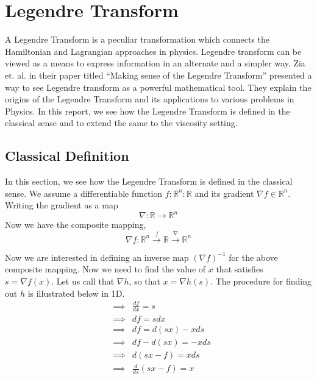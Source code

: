 \section{Legendre Transform}
A Legendre Transform is a peculiar transformation which connects the
Hamiltonian and Lagrangian approaches in physics. Legendre transform
can be viewed as a means to express information in an alternate and a
simpler way. Zia et. al. in their paper titled ``Making sense of the
Legendre Transform''\cite{ZIA} presented a way to see Legendre transform as a
powerful mathematical tool. They explain the origins of the Legendre
Transform and its applications to various problems in Physics. In this
report, we see how the Legendre Transform is defined in the classical
sense and to extend the same to the viscosity setting.

\subsection{Classical Definition}
In this section, we see how the Legendre Transform is defined in the
classical sense. We assume a differentiable function $f:\mathbb{R}^n :
\mathbb{R}$ and its
gradient $\nabla f \in \mathbb{R}^n$. Writing the gradient as a map
\begin{equation}
  \nabla : \mathbb{R} \to \mathbb{R}^n
\end{equation}
Now we have the composite mapping,
\begin{equation}
  \nabla f : \mathbb{R}^n \xrightarrow{f} \mathbb{R}
  \xrightarrow{\nabla} \mathbb{R}^n
\end{equation}

\noindent
Now we are interested in defining an inverse map $(\nabla f)^{-1}$ for the
above composite mapping. Now we need to find the value of $x$ that
satisfies $s = \nabla f(x)$. Let us call that $\nabla h$, so that
$x = \nabla h(s)$. The procedure for finding out $h$ is illustrated
below in 1D.
\begin{eqnarray}
  &\implies&\frac{df}{dx} = s \nonumber\\
  &\implies& df = sdx \nonumber\\
  &\implies& df = d(sx) - xds\nonumber\\
  &\implies& df - d(sx) = -xds\nonumber\\
  &\implies& d(sx - f) = xds\nonumber\\
  &\implies& \frac{d}{ds}(sx - f) = x
\end{eqnarray}

